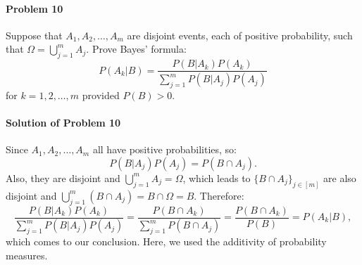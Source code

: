 \documentclass{article}
\begin{document}
\paragraph{Problem 10} Suppose that $A_1, A_2,\ldots, A_m$ are disjoint events, each of positive probability, such that $\Omega=\bigcup_{j=1}^{m} A_j$. Prove Bayes' formula:
\[P(A_k|B)=\frac{P(B|A_k)P(A_k)}{\sum_{j=1}^{m}P(B|A_j)P(A_j)}\]
for $k=1,2,\ldots, m$ provided $P(B)>0$.

\paragraph{Solution of Problem 10} Since $A_1, A_2, \ldots, A_m$ all have positive probabilities, so:
\[P(B|A_j)P(A_j)=P(B\cap A_j).\]
Also, they are disjoint and $\bigcup_{j=1}^{m}A_j=\Omega$, which leads to $\{B\cap A_j\}_{j\in[m]}$ are also disjoint and $\bigcup_{j=1}^{m}(B\cap A_j)=B\cap \Omega=B$. Therefore:
\[\frac{P(B|A_k)P(A_k)}{\sum_{j=1}^{m}P(B|A_j)P(A_j)}=\frac{P(B\cap A_k)}{\sum_{j=1}^{m}P(B\cap A_j)}=\frac{P(B\cap A_k)}{P(B)}=P(A_k|B),\]
which comes to our conclusion. Here, we used the additivity of probability measures.
\end{document}
